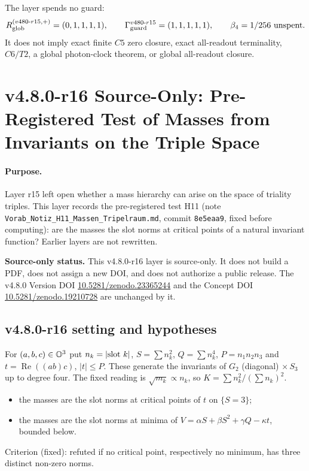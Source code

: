 The layer spends no guard:
\[
R_{\rm glob}^{(v480\text{-}r15,+)}=(0,1,1,1,1),
\qquad
\Gamma_{\rm guard}^{v480\text{-}r15}=(1,1,1,1,1),
\qquad
\beta_4=1/256\ \text{unspent}.
\]
It does not imply exact finite \(C5\) zero closure, exact all-readout terminality,
\(C6/T2\), a global photon-clock theorem, or global all-readout closure.

\clearpage
\section*{v4.8.0-r16 Source-Only: Pre-Registered Test of Masses from Invariants on the Triple Space}
\label{sec:v480-r16-triple-space-masses}

\paragraph{Purpose.}
Layer r15 left open whether a mass hierarchy can arise on the space of triality triples.  This layer records the
pre-registered test H11 (note \texttt{Vorab\_Notiz\_H11\_Massen\_Tripelraum.md}, commit \texttt{8e5eaa9}, fixed
before computing): are the masses the slot norms at critical points of a natural invariant function?  Earlier
layers are not rewritten.

\noindent\textbf{Source-only status.}
This v4.8.0-r16 layer is source-only.  It does not build a PDF, does not assign a new DOI,
and does not authorize a public release.  The v4.8.0 Version DOI
\href{https://doi.org/10.5281/zenodo.23365244}{10.5281/zenodo.23365244} and the Concept DOI
\href{https://doi.org/10.5281/zenodo.19210728}{10.5281/zenodo.19210728} are unchanged by it.

\subsection*{v4.8.0-r16 setting and hypotheses}
\label{subsec:v480-r16-setting}

For \((a,b,c)\in\mathbb{O}^3\) put \(n_k=|{\rm slot}\ k|\), \(S=\sum n_k^2\), \(Q=\sum n_k^4\), \(P=n_1n_2n_3\) and
\(t=\operatorname{Re}((ab)c)\), \(|t|\le P\).  These generate the invariants of \(G_2\) (diagonal)
\(\times\,S_3\) up to degree four.  The fixed reading is \(\sqrt{m_k}\propto n_k\), so
\(K=\sum n_k^2/(\sum n_k)^2\).
\begin{itemize}
\item[H11a:] the masses are the slot norms at critical points of \(t\) on \(\{S=3\}\);
\item[H11b:] the masses are the slot norms at minima of
\(V=\alpha S+\beta S^2+\gamma Q-\kappa t\), bounded below.
\end{itemize}
Criterion (fixed): refuted if no critical point, respectively no minimum, has three distinct non-zero norms.


